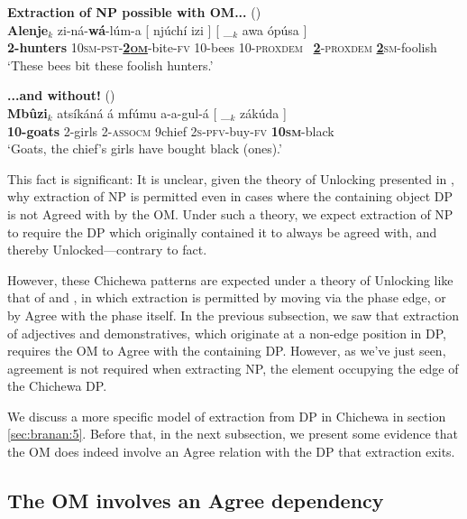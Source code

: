 \documentclass[output=paper,colorlinks,citecolor=brown]{langscibook}
\begin{document}
\ea%
    \label{ex:branan:9}
    \textbf{Extraction of NP possible with OM...} \hfill{(\citealt[50, ex. 16c]{Mchombo2004})}\\
    \gll    \textbf{Alenje}$_{k}$  zi-n\'{a}-\textbf{w\'{a}}-l\'{u}m-a [ nj\'{u}ch\'{i} izi ] [ \_$_{k}$  awa \'{o}p\'{u}sa ] \\
            \textbf{2-hunters} 10\textsc{sm-pst}-\textbf{\underline{2\textsc{om}}}-bite-\textsc{fv} {} 10-bees 10-\textsc{proxdem} {} {} \, \underline{\textbf{2}}-\textsc{proxdem} \underline{\textbf{2}}\textsc{sm}-foolish \\
    \glt    `These bees bit these foolish hunters.'
\z

\ea%
    \label{ex:branan:10}
    \textbf{...and without!} \hfill{(\citealt[ex. 4]{Mchombo2006})}\\
    \gll    \textbf{Mb\^{u}zi}$_{k}$ ats\'{i}k\'{a}n\'{a} \'{a} mf\'{u}mu a-a-gul-\'{a} [ \_$_{k}$ z\'{a}k\'{u}da ] \\
            \textbf{10-goats} 2-girls 2-\textsc{assocm} 9chief 2\textsc{s-pfv}-buy-\textsc{fv} {} {} \textbf{10\textsc{sm}}-black   \\
    \glt    `Goats, the chief's girls have bought black (ones).'
\z

This fact is significant: It is unclear, given the theory of Unlocking presented in \citet{VanUrkRichards2015}, why extraction of NP is permitted even in cases where the containing object DP is not Agreed with by the OM. Under such a theory, we expect extraction of NP to require the DP which originally contained it to always be agreed with, and thereby Unlocked---contrary to fact.

However, these Chichewa patterns are expected under a theory of Unlocking like that of \citet{RackowskiRichards2005} and \citet{Branan2018}, in which extraction is permitted by moving via the phase edge, or by Agree with the phase itself. In the previous subsection, we saw that extraction of adjectives and demonstratives, which originate at a non-edge position in DP, requires the OM to Agree with the containing DP. However, as we've just seen, agreement is not required when extracting NP, the element occupying the edge of the Chichewa DP.

We discuss a more specific model of extraction from DP in Chichewa in section \ref{sec:branan:5}. Before that, in the next subsection, we present some evidence that the OM does indeed involve an Agree relation with the DP that extraction exits.

\subsection{The OM involves an Agree dependency}\label{sec:branan:3.3}
\end{document}
